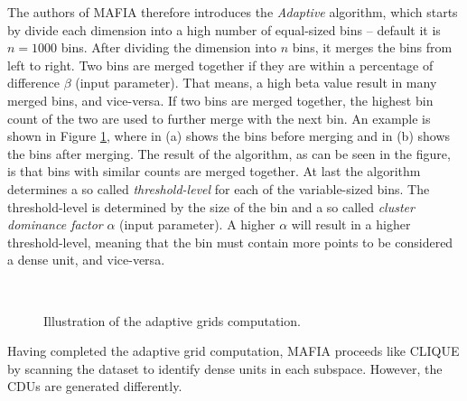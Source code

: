 The authors of MAFIA therefore introduces the \textit{Adaptive} algorithm, which starts by divide each dimension into a high number of equal-sized bins -- default it is $n = 1000$ bins. After dividing the dimension into $n$ bins, it merges the bins from left to right. Two bins are merged together if they are within a percentage of difference $\beta$ (input parameter). That means, a high beta value result in many merged bins, and vice-versa. If two bins are merged together, the highest bin count of the two are used to further merge with the next bin. An example is shown in Figure \ref{fig:adaptive_grids}, where in (a) shows the bins before merging and in (b) shows the bins after merging. The result of the algorithm, as can be seen in the figure, is that bins with similar counts are merged together. At last the algorithm determines a so called \textit{threshold-level} for each of the variable-sized bins. The threshold-level is determined by the size of the bin and a so called \textit{cluster dominance factor} $\alpha$ (input parameter). A higher $\alpha$ will result in a higher threshold-level, meaning that the bin must contain more points to be considered a dense unit, and vice-versa.

\begin{figure}[H]
    \vspace*{-0.5cm}
    \centering
    ~~~~
    ~~~~
    \caption{Illustration of the adaptive grids computation.}
    \label{fig:adaptive_grids}
    \vspace*{-0.5cm}
\end{figure}

Having completed the adaptive grid computation, MAFIA proceeds like CLIQUE by scanning the dataset to identify dense units in each subspace. However, the CDUs are generated differently.

